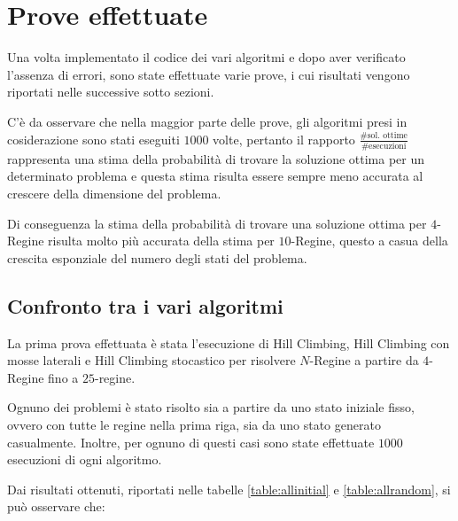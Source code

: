 
\clearpage
\section{Prove effettuate}

Una volta implementato il codice dei vari algoritmi e dopo aver verificato l'assenza di errori, sono state effettuate varie prove, i cui risultati vengono riportati nelle successive sotto sezioni.

C'è da osservare che nella maggior parte delle prove, gli algoritmi presi in cosiderazione sono stati eseguiti $1000$ volte, pertanto il rapporto $\frac{\text{\# sol. ottime}}{\text{\# esecuzioni}}$ rappresenta una stima della probabilità di trovare la soluzione ottima per un determinato problema e questa stima risulta essere sempre meno accurata al crescere della dimensione del problema.

Di conseguenza la stima della probabilità di trovare una soluzione ottima per $4$-Regine risulta molto più accurata della stima per $10$-Regine, questo a casua della crescita esponziale del numero degli stati del problema.

\subsection{Confronto tra i vari algoritmi}

La prima prova effettuata è stata l'esecuzione di Hill Climbing, Hill Climbing con mosse laterali e Hill Climbing stocastico per risolvere $N$-Regine a partire da $4$-Regine fino a $25$-regine.

Ognuno dei problemi è stato risolto sia a partire da uno stato iniziale fisso, ovvero con tutte le regine nella prima riga, sia da uno stato generato casualmente. Inoltre, per ognuno di questi casi sono state effettuate $1000$ esecuzioni di ogni algoritmo.

Dai risultati ottenuti, riportati nelle tabelle \ref{table:allinitial} e \ref{table:allrandom}, si può osservare che:

